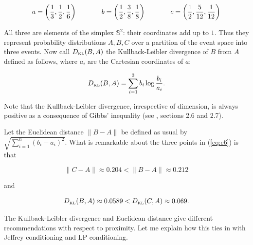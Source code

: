 \documentclass[11pt]{article}
\begin{document}
\begin{equation}
  \label{eq:e6}
  a=\left(\frac{1}{3},\frac{1}{2},\frac{1}{6}\right) \hspace{.5in}
  b=\left(\frac{1}{2},\frac{3}{8},\frac{1}{8}\right)  \hspace{.5in}
  c=\left(\frac{1}{2},\frac{5}{12},\frac{1}{12}\right)
\end{equation}

All three are elements of the simplex $\mathbb{S}^{2}$: their
coordinates add up to $1$. Thus they represent probability
distributions $A,B,C$ over a partition of the event space into three
events. Now call $D_{\mbox{\tiny KL}}(B,A)$ the Kullback-Leibler
divergence of $B$ from $A$ defined as follows, where $a_{i}$ are the
Cartesian coordinates of $a$:

\begin{equation}
  \label{eq:e7}
  D_{\mbox{\tiny KL}}(B,A)=\sum_{i=1}^{3}b_{i}\log\frac{b_{i}}{a_{i}}.
\end{equation}

Note that the Kullback-Leibler divergence, irrespective of dimension,
is always positive as a consequence of Gibbs' inequality (see
, sections 2.6 and 2.7).

Let the Euclidean distance $\|B-A\|$ be defined as usual by
$\sqrt{\sum_{i=1}^{n}\left(b_{i}-a_{i}\right)^{2}}$. What is
remarkable about the three points in (\ref{eq:e6}) is that

\begin{equation}
  \label{eq:e8}
  \|C-A\|\approx{}0.204<\|B-A\|\approx{}0.212
\end{equation}

and

\begin{equation}
  \label{eq:e9}
  D_{\mbox{\tiny KL}}(B,A)\approx{}0.0589<D_{\mbox{\tiny KL}}(C,A)\approx{}0.069.
\end{equation}

The Kullback-Leibler divergence and Euclidean distance give different
re\-commendations with respect to proximity. Let me explain how this
ties in with Jeffrey conditioning and LP conditioning.
\end{document}
